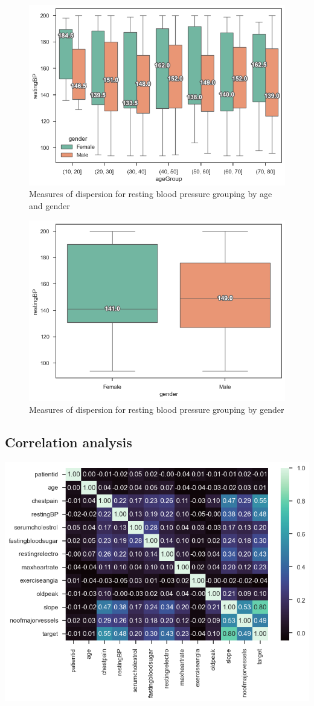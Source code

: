 \begin{figure}
    \caption{Measures of dispersion for resting blood pressure grouping by age and gender}\label{boxplot-bp-age}
    \centering
    \includegraphics[width=\linewidth]{media/boxplot-07-agegroup-gender-bp.png}
\end{figure}

\begin{figure}
    \caption{Measures of dispersion for resting blood pressure grouping by gender}\label{boxplot-bp-gender}
    \centering
    \includegraphics[width=\linewidth]{media/boxplot-08-gender-bp.png}
\end{figure}


\subsection{Correlation analysis}

\includegraphics[width=0.8\linewidth]{media/correlation-matrix.png}